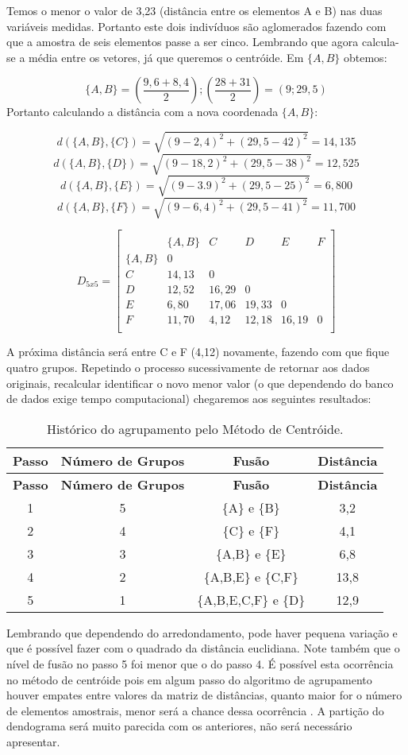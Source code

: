 \documentclass[
]{book}
\begin{document}
Temos o menor o valor de 3,23 (distância entre os elementos A e B) nas duas variáveis medidas. Portanto este dois indivíduos são aglomerados fazendo com que a amostra de seis elementos passe a ser cinco. Lembrando que agora calcula-se a média entre os vetores, já que queremos o centróide. Em \(\{A,B\}\) obtemos:

\[\{A,B\}=(\frac{9,6+8,4}{2});(\frac{28+31}{2})=(9;29,5)\]
Portanto calculando a distância com a nova coordenada \(\{A,B\}\):

\[d(\{A,B\},\{C\})=\sqrt{(9-2,4)^2+(29,5-42)^2}=14,135\]
\[d(\{A,B\},\{D\})=\sqrt{(9-18,2)^2+(29,5-38)^2}=12,525\]
\[d(\{A,B\},\{E\})=\sqrt{(9-3.9)^2+(29,5-25)^2}=6,800\]
\[d(\{A,B\},\{F\})=\sqrt{(9-6,4)^2+(29,5-41)^2}=11,700\]

\[D_{5x5}=\begin{bmatrix}\\
 &\{A,B\}&C&D&E&F \\
 \{A,B\}&0&&&&\\
 C & 14,13&0&&&\\
 D& 12,52& 16,29&0&&\\
 E& 6,80& 17,06& 19,33&0&\\
 F& 11,70& 4,12& 12,18& 16,19&0 \\
\end{bmatrix}\]

A próxima distância será entre C e F (4,12) novamente, fazendo com que fique quatro grupos. Repetindo o processo sucessivamente de retornar aos dados originais, recalcular identificar o novo menor valor (o que dependendo do banco de dados exige tempo computacional) chegaremos aos seguintes resultados:

\begin{longtable}[]{@{}cccc@{}}
\caption{\label{tab:ligcent} Histórico do agrupamento pelo Método de Centróide.}\tabularnewline
\toprule
\textbf{Passo} & \textbf{Número de Grupos} & \textbf{Fusão} & \textbf{Distância}\tabularnewline
\midrule
\endfirsthead
\toprule
\textbf{Passo} & \textbf{Número de Grupos} & \textbf{Fusão} & \textbf{Distância}\tabularnewline
\midrule
\endhead
1 & 5 & \{A\} e \{B\} & 3,2\tabularnewline
2 & 4 & \{C\} e \{F\} & 4,1\tabularnewline
3 & 3 & \{A,B\} e \{E\} & 6,8\tabularnewline
4 & 2 & \{A,B,E\} e \{C,F\} & 13,8\tabularnewline
5 & 1 & \{A,B,E,C,F\} e \{D\} & 12,9\tabularnewline
\bottomrule
\end{longtable}

Lembrando que dependendo do arredondamento, pode haver pequena variação e que é possível fazer com o quadrado da distância euclidiana. Note também que o nível de fusão no passo 5 foi menor que o do passo 4. É possível esta ocorrência no método de centróide pois em algum passo do algoritmo de agrupamento houver empates entre valores da matriz de distâncias, quanto maior for o número de elementos amostrais, menor será a chance dessa ocorrência \citep{mingoti2007analise}. A partição do dendograma será muito parecida com os anteriores, não será necessário apresentar.
\end{document}
